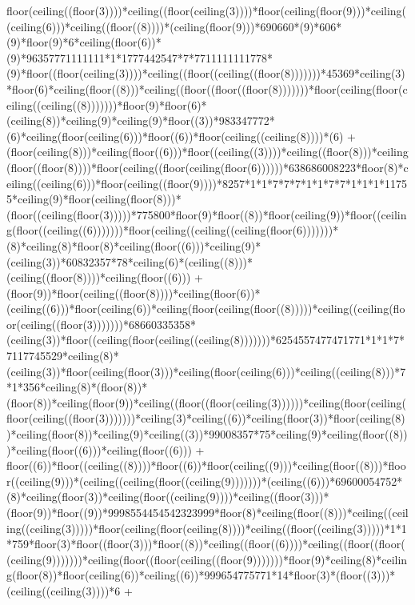 floor(ceiling((floor(3))))*ceiling((floor(ceiling(3))))*floor(ceiling(floor(9)))*ceiling((ceiling(6)))*ceiling((floor((8))))*(ceiling(floor(9)))*690660*(9)*606*(9)*floor(9)*6*ceiling(floor(6))*(9)*96357771111111*1*1777442547*7*7711111111778*(9)*floor((floor(ceiling(3))))*ceiling((floor((ceiling((floor(8)))))))*45369*ceiling(3)*floor(6)*ceiling(floor((8)))*ceiling((floor((floor((floor(8)))))))*floor(ceiling(floor(ceiling((ceiling((8)))))))*floor(9)*floor(6)*(ceiling(8))*ceiling(9)*ceiling(9)*floor((3))*983347772*(6)*ceiling(floor(ceiling(6)))*floor((6))*floor(ceiling((ceiling(8))))*(6) + (floor(ceiling(8)))*ceiling(floor((6)))*floor((ceiling((3))))*ceiling((floor(8)))*ceiling(floor((floor(8))))*floor(ceiling((floor(ceiling(floor(6))))))*638686008223*floor(8)*ceiling((ceiling(6)))*floor(ceiling((floor(9))))*8257*1*1*7*7*7*1*1*7*7*1*1*1*11755*ceiling(9)*floor(ceiling(floor(8)))*(floor((ceiling(floor(3)))))*775800*floor(9)*floor((8))*floor(ceiling(9))*floor((ceiling(floor((ceiling((6)))))))*floor(ceiling((ceiling((ceiling(floor(6)))))))*(8)*ceiling(8)*floor(8)*ceiling(floor((6)))*ceiling(9)*(ceiling(3))*60832357*78*ceiling(6)*(ceiling((8)))*(ceiling((floor(8))))*ceiling(floor((6))) + (floor(9))*floor(ceiling((floor(8))))*ceiling(floor(6))*(ceiling((6)))*floor(ceiling(6))*ceiling(floor(ceiling(floor((8)))))*ceiling((ceiling(floor(ceiling((floor(3)))))))*68660335358*(ceiling(3))*floor((ceiling(floor(ceiling((ceiling(8)))))))*6254557477471771*1*1*7*7117745529*ceiling(8)*(ceiling(3))*floor(ceiling(floor(3)))*ceiling(floor(ceiling(6)))*ceiling((ceiling(8)))*7*1*356*ceiling(8)*(floor(8))*(floor(8))*ceiling(floor(9))*ceiling((floor((floor(ceiling(3))))))*ceiling(floor(ceiling(floor(ceiling((floor(3)))))))*ceiling(3)*ceiling((6))*ceiling(floor(3))*floor(ceiling(8))*ceiling(floor(8))*ceiling(9)*ceiling((3))*99008357*75*ceiling(9)*ceiling(floor((8)))*ceiling(floor((6)))*ceiling(floor((6))) + floor((6))*floor((ceiling((8))))*floor((6))*floor(ceiling((9)))*ceiling(floor((8)))*floor((ceiling(9)))*(ceiling((ceiling(floor((ceiling(9)))))))*(ceiling((6)))*69600054752*(8)*ceiling(floor(3))*ceiling(floor((ceiling(9))))*ceiling((floor(3)))*(floor(9))*floor((9))*9998554454542323999*floor(8)*ceiling(floor((8)))*ceiling((ceiling((ceiling(3)))))*floor(ceiling(floor(ceiling(8))))*ceiling((floor((ceiling(3)))))*1*1*759*floor(3)*floor((floor(3)))*floor((8))*ceiling((floor((6))))*ceiling((floor((floor((ceiling(9)))))))*ceiling(floor((floor(ceiling((floor(9)))))))*floor(9)*ceiling(8)*ceiling(floor(8))*floor(ceiling(6))*ceiling((6))*999654775771*14*floor(3)*(floor((3)))*(ceiling((ceiling(3))))*6 + 